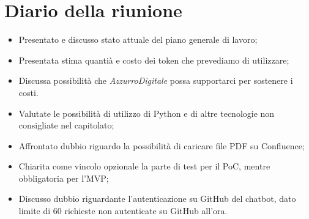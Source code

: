 

\section{Diario della riunione}

\begin{itemize}
    \item Presentato e discusso stato attuale del piano generale di lavoro;
    \item Presentata stima quantià e costo dei token che prevediamo di utilizzare;
    \item Discussa possibilità che \emph{AzzurroDigitale} possa supportarci per sostenere i costi.
    \item Valutate le possibilità di utilizzo di Python e di altre tecnologie non consigliate nel capitolato;
    \item Affrontato dubbio riguardo la possibilità di caricare file PDF su Confluence;
    \item Chiarita come vincolo opzionale la parte di test per il PoC, mentre obbligatoria per l'MVP;
    \item Discusso dubbio riguardante l'autenticazione su GitHub del chatbot, dato limite di 60 richieste non autenticate su GitHub all'ora.
\end{itemize}